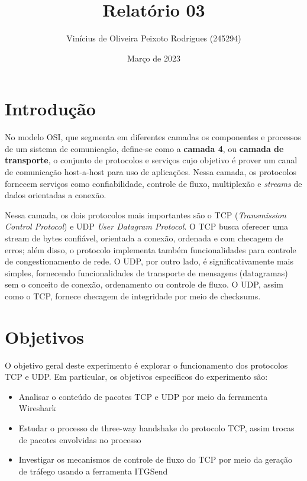 \documentclass{article}
\title{Relatório 03}
\author{Vinícius de Oliveira Peixoto Rodrigues (245294)}
\date{Março de 2023}
\begin{document}
\maketitle

\section{Introdução}

No modelo OSI, que segmenta em diferentes camadas os componentes
e processos de um sistema de comunicação, define-se como a \textbf{camada 4}, ou \textbf{camada de transporte}, o conjunto de protocolos e serviços cujo
objetivo é prover um canal de comunicação host-a-host para uso de
aplicações. Nessa camada, os protocolos fornecem serviços como confiabilidade,
controle de fluxo, multiplexão e \textit{streams} de dados orientadas a
conexão.

Nessa camada, os dois protocolos mais importantes são o TCP
(\textit{Transmission Control Protocol}) e UDP \textit{User Datagram Protocol}.
O TCP busca oferecer uma stream de bytes confiável, orientada a conexão,
ordenada e com checagem de erros; além disso,
o protocolo implementa também funcionalidades para controle de
congestionamento de rede. O UDP, por outro lado, é significativamente
mais simples, fornecendo funcionalidades de transporte de mensagens
(datagramas) sem o conceito de conexão, ordenamento ou controle de fluxo.
O UDP, assim como o TCP, fornece checagem de integridade por meio
de checksums.

\section{Objetivos}

O objetivo geral deste experimento é explorar o funcionamento dos
protocolos TCP e UDP. Em particular, os objetivos específicos do
experimento são:

\begin{itemize}
    \item Analisar o conteúdo de pacotes TCP e UDP por meio
          da ferramenta Wireshark
    \item Estudar o processo de three-way handshake do protocolo
          TCP, assim trocas de pacotes envolvidas no processo
    \item Investigar os mecanismos de controle de fluxo do TCP por
          meio da geração de tráfego usando a ferramenta ITGSend
\end{itemize}
\end{document}

